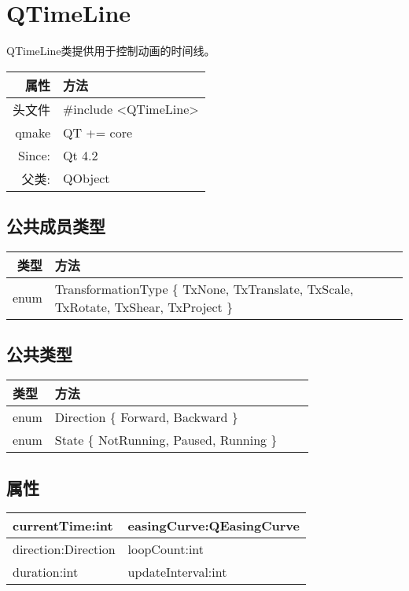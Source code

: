\chapter{QTimeLine}

QTimeLine类提供用于控制动画的时间线。

\begin{tabular}{|r|l|}
	\hline
	属性 & 方法 \\
	\hline
	头文件 & \#include <QTimeLine>\\      
	\hline
	qmake & QT += core\\      
	\hline
	Since: 	& Qt 4.2\\ 
	\hline
	父类: &	QObject \\ 
	\hline
\end{tabular}

\section{公共成员类型}

\begin{tabular}{|r|m{32em}|}
\hline
类型 &	方法 \\
\hline
enum 	& TransformationType \{ TxNone, TxTranslate, TxScale, TxRotate, TxShear, TxProject \}\\
\hline
\end{tabular}


\section{公共类型}

\begin{tabular}{|l|l|l|l|}
\hline
类型 	& 方法 \\ 
\hline
enum 	& Direction \{ Forward, Backward \} \\ 
\hline
enum  &	State \{ NotRunning, Paused, Running \} \\ 
\hline
\end{tabular}

\section{属性}

\begin{tabular}{|l|l|}
\hline
currentTime:int &	easingCurve:QEasingCurve \\ 
\hline
direction:Direction &	loopCount:int \\ 
\hline
duration:int 	& updateInterval:int \\ 
\hline
\end{tabular}

